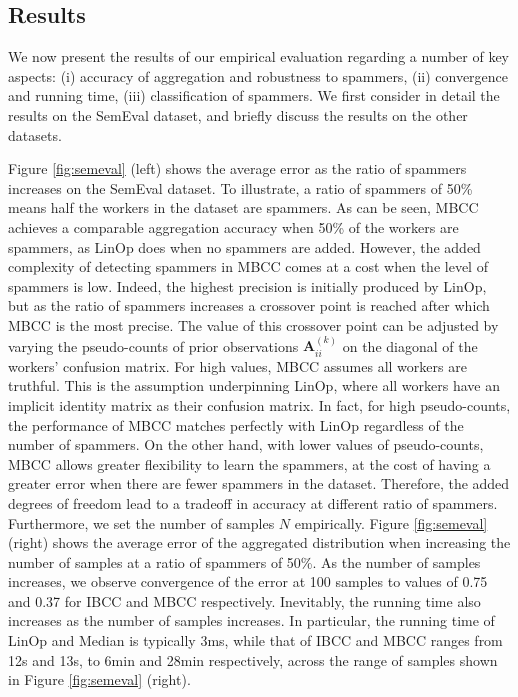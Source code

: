 \documentclass{article}
\begin{document}
\subsection{Results}

\label{sub:4.5-Results}



We now present the results of our empirical evaluation regarding a
number of key aspects: (i) accuracy of aggregation and robustness
to spammers, (ii) convergence and running time, (iii) classification
of spammers.  We first consider  in detail the results on the SemEval
dataset, and briefly discuss the results on the other datasets.

Figure \ref{fig:semeval} (left) shows the average error as the
ratio of spammers increases on the SemEval dataset.  To illustrate,
a ratio of spammers of 50\% means half the workers in the dataset
are spammers. As can be seen, MBCC achieves a comparable aggregation
accuracy when 50\% of the workers are spammers, as LinOp does when
no spammers are added. However, the added complexity of detecting
spammers in MBCC comes at a cost when the level of spammers is low.
Indeed, the highest precision is initially produced by LinOp, but
as the ratio of spammers increases a crossover point is reached after
which MBCC is the most precise. The value of this crossover point
can be adjusted by varying the pseudo-counts of prior observations
$\mathbf{A}_{ii}^{(k)}$ on the diagonal of the workers' confusion
matrix. For high values, MBCC assumes all workers are truthful.
This is the assumption underpinning LinOp, where all workers have
an implicit identity matrix as their confusion matrix. In fact, for
high pseudo-counts, the performance of MBCC matches perfectly with
LinOp regardless of the number of spammers. On the other hand, with
lower values of pseudo-counts, MBCC allows greater flexibility to
learn the spammers, at the cost of having a greater error when there
are fewer spammers in the dataset. Therefore, the added degrees of
freedom lead to a tradeoff in accuracy at different ratio of spammers.
Furthermore, we set the number of samples $N$ empirically. Figure
\ref{fig:semeval} (right) shows the average error of the aggregated
distribution when increasing the number of samples at a ratio of
spammers of 50\%. As the number of samples increases, we observe
convergence of the error at 100 samples to values of 0.75 and 0.37
for IBCC and MBCC respectively. Inevitably, the running time also
increases as the number of samples increases.  In particular, the
running time of LinOp and Median is typically 3ms, while that of
IBCC and MBCC ranges from 12s and 13s, to 6min and 28min respectively,
across the range of samples shown in Figure \ref{fig:semeval} (right).
\end{document}
